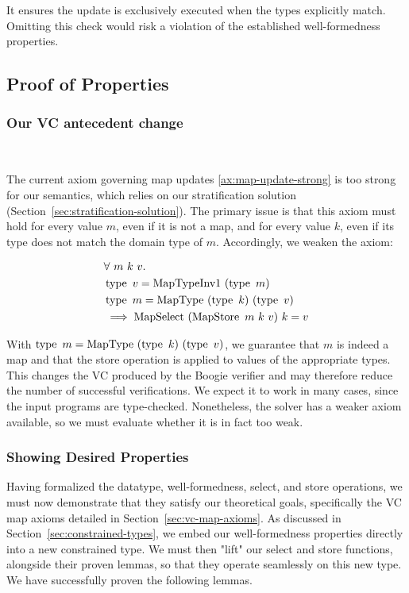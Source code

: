 \documentclass[11pt]{article}
\begin{document}
It ensures the update is exclusively executed when the types explicitly match.
Omitting this check would risk a violation of the established well-formedness properties.


\subsection{Proof of Properties}

\subsubsection{Our VC antecedent change} \mbox{}\\
\label{sec:our-vc-change}

The current axiom governing map updates \eqref{ax:map-update-strong}
is too strong for our semantics,
which relies on our stratification solution (Section~\ref{sec:stratification-solution}).
The primary issue is that this axiom must hold for every value $m$,
even if it is not a map, and for every value $k$,
even if its type does not match the domain type of $m$.
Accordingly, we weaken the axiom:

\begin{equation}
  \label{ax:map-update-weak}
  \begin{aligned}
    &\forall \ m \ k \ v.\\
    &\operatorname{type}\ v = \operatorname{MapTypeInv1}\ (\operatorname{type}\ m)\\
    &\operatorname{type}\ m = \operatorname{MapType}\ (\operatorname{type}\ k)\ (\operatorname{type}\ v)\\
    &\implies  \operatorname{MapSelect}\ (\operatorname{MapStore}\ m\ k\ v)\ k = v
  \end{aligned}
\end{equation}

With $\type\ m = \MapType\ (\type\ k)\ (\type\ v)$, we guarantee
that $m$ is indeed a map and that the store operation is applied to values of the appropriate types.
This changes the VC produced by the Boogie verifier
and may therefore reduce the number of successful verifications.
We expect it to work in many cases, since the input programs are type-checked.
Nonetheless, the solver has a weaker axiom available,
so we must evaluate whether it is in fact too weak.


\subsubsection{Showing Desired Properties}
\label{sec:typedef-lifting}

Having formalized the datatype, well-formedness, select, and store operations, we must now demonstrate that they satisfy our theoretical goals, specifically the VC map axioms detailed in Section~\ref{sec:vc-map-axioms}.
As discussed in Section~\ref{sec:constrained-types}, we embed our well-formedness properties directly into a new constrained type.
We must then "lift" our select and store functions, alongside their proven lemmas, so that they operate seamlessly on this new type.
We have successfully proven the following lemmas.
\end{document}
